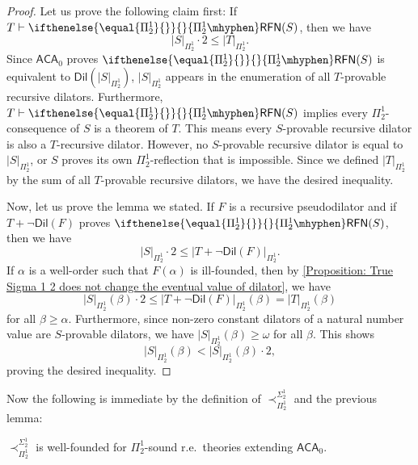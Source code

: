 \documentclass{mhkr}
\newcommand{\Dil}{\mathsf{Dil}}
\newcommand{\RFN}[1][]{\ifthenelse{\equal{#1}{}}{}{#1\mhyphen}\mathsf{RFN}}
\newcommand{\ACA}{\mathsf{ACA}}
\begin{document}
\begin{proof}
    Let us prove the following claim first: If $T \vdash \RFN[\Pi^1_2](S)$, then we have 
    \begin{equation*}
        |S|_{\Pi^1_2}\cdot 2\le |T|_{\Pi^1_2}.
    \end{equation*}
    Since $\ACA_0$ proves $\RFN[\Pi^1_2](S)$ is equivalent to $\Dil(|S|_{\Pi^1_2})$, $|S|_{\Pi^1_2}$ appears in the enumeration of all $T$-provable recursive dilators.
    Furthermore, $T \vdash \RFN[\Pi^1_2](S)$ implies every $\Pi^1_2$-consequence of $S$ is a theorem of $T$. This means every $S$-provable recursive dilator is also a $T$-recursive dilator.
    However, no $S$-provable recursive dilator is equal to $|S|_{\Pi^1_2}$, or $S$ proves its own $\Pi^1_2$-reflection that is impossible. Since we defined $|T|_{\Pi^1_2}$ by the sum of all $T$-provable recursive dilators, we have the desired inequality.

    Now, let us prove the lemma we stated. If $F$ is a recursive pseudodilator and if $T+\lnot\Dil(F)$ proves $\RFN[\Pi^1_2](S)$, then we have
    \begin{equation*}
        |S|_{\Pi^1_2}\cdot 2\le |T+\lnot\Dil(F)|_{\Pi^1_2}.
    \end{equation*}
    If $\alpha$ is a well-order such that $F(\alpha)$ is ill-founded, then by \autoref{Proposition: True Sigma 1 2 does not change the eventual value of dilator}, we have 
    \begin{equation*}
        |S|_{\Pi^1_2}(\beta)\cdot 2 \le |T+\lnot\Dil(F)|_{\Pi^1_2}(\beta) = |T|_{\Pi^1_2}(\beta)
    \end{equation*}
    for all $\beta\ge\alpha$. Furthermore, since non-zero constant dilators of a natural number value are $S$-provable dilators, we have $|S|_{\Pi^1_2}(\beta)\ge \omega$ for all $\beta$. This shows 
    \begin{equation*}
        |S|_{\Pi^1_2}(\beta) < |S|_{\Pi^1_2}(\beta)\cdot 2,
    \end{equation*}
    proving the desired inequality.
\end{proof}

Now the following is immediate by the definition of $\prec^{\Sigma^1_2}_{\Pi^1_2}$ and the previous lemma:
\begin{corollary} \pushQED{\qed}
    $\prec^{\Sigma^1_2}_{\Pi^1_2}$ is well-founded for $\Pi^1_2$-sound r.e.\ theories extending $\ACA_0$. \qedhere 
\end{corollary}
\end{document}

